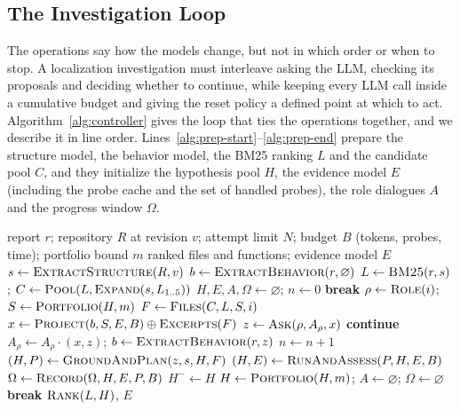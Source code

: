 \documentclass[a4paper,fleqn]{cas-sc}
\newcommand{\tool}{MORPH-FL}
\begin{document}
\subsection{The Investigation Loop}\label{sec:procedure}
The operations say how the models change, but not in which order or when to stop. A localization investigation must interleave asking the LLM, checking its proposals and deciding whether to continue, while keeping every LLM call inside a cumulative budget and giving the reset policy a defined point at which to act. Algorithm~\ref{alg:controller} gives the loop that ties the operations together, and we describe it in line order. Lines~\ref{alg:prep-start}--\ref{alg:prep-end} prepare the structure model, the behavior model, the BM25 ranking $L$ and the candidate pool $C$, and they initialize the hypothesis pool $H$, the evidence model $E$ (including the probe cache and the set of handled probes), the role dialogues $A$ and the progress window $\Omega$.

\begin{algorithm}[!htbp]
\caption{The \tool{} investigation loop}\label{alg:controller}
\begin{algorithmic}[1]\small
\Require report $r$; repository $R$ at revision $v$; attempt limit $N$; budget $B$ (tokens, probes, time); portfolio bound $m$
\Ensure ranked files and functions; evidence model $E$
\State $s\gets\textsc{ExtractStructure}(R,v)$\label{alg:prep-start}
\State $b\gets\textsc{ExtractBehavior}(r,\varnothing)$\label{alg:behavior}
\State $L\gets\textsc{BM25}(r,s)$;\; $C\gets\textsc{Pool}(L,\textsc{Expand}(s,L_{1..5}))$\label{alg:pool}
\State $H,E,A,\Omega\gets\varnothing$;\; $n\gets0$\label{alg:prep-end}
  \label{alg:admit} \State \textbf{break} \EndIf
  \State $\rho\gets\textsc{Role}(i)$;\; $S\gets\textsc{Portfolio}(H,m)$\label{alg:select}
  \State $F\gets\textsc{Files}(C,L,S,i)$
  \State $x\gets\textsc{Project}(b,S,E,B)\oplus\textsc{Excerpts}(F)$\label{alg:project}
  \State $z\gets\textsc{Ask}(\rho,A_\rho,x)$ \label{alg:ask}
  \label{alg:reject} \State \textbf{continue}  \EndIf
  \State $A_\rho\gets A_\rho\cdot(x,z)$;\; $b\gets\textsc{ExtractBehavior}(r,z)$\label{alg:accept}
  \State $n\gets n+1$ 
  \State $(H,P)\gets\textsc{GroundAndPlan}(z,s,H,F)$\label{alg:ground}
  \State $(H,E)\gets\textsc{RunAndAssess}(P,H,E,B)$\label{alg:run}
  \State $\Omega\gets\textsc{Record}(\Omega,H,E,P,B)$\label{alg:record}
  \State $H^{-}\gets H$ 
  \label{alg:stagnated}
    \State $H\gets\textsc{Portfolio}(H,m)$;\; $A\gets\varnothing$;\; $\Omega\gets\varnothing$ \label{alg:reset}
  \EndIf
  \label{alg:stop} \State \textbf{break} \EndIf
\EndFor
\State \Return $\textsc{Rank}(L,H)$, $E$\label{alg:rank}
\end{algorithmic}
\end{algorithm}
\end{document}
